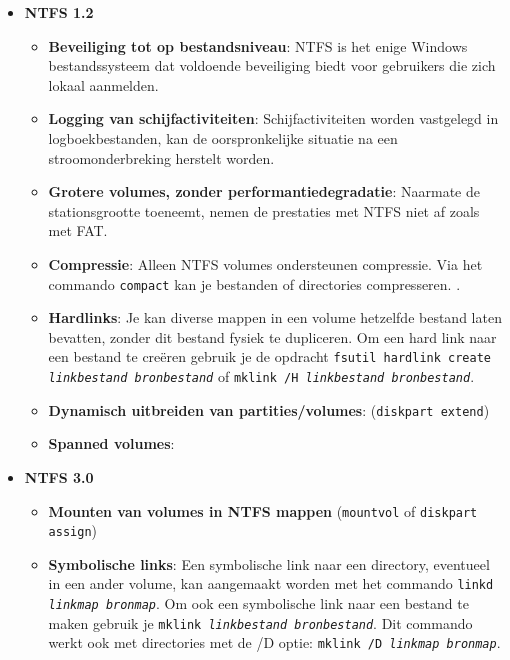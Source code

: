 \begin{enumerate}
		 {
			\begin{itemize}
				\item \textbf{NTFS 1.2}
					\begin{itemize}
						\item \textbf{Beveiliging tot op bestandsniveau}: NTFS is het enige Windows bestandssysteem dat voldoende beveiliging biedt voor gebruikers die zich lokaal aanmelden.
						\item \textbf{Logging van schijfactiviteiten}: Schijfactiviteiten worden vastgelegd in logboekbestanden, kan de oorspronkelijke situatie na een stroomonderbreking herstelt worden.
						\item \textbf{Grotere volumes, zonder performantiedegradatie}: Naarmate de stationsgrootte toeneemt, nemen de prestaties met NTFS niet af zoals met FAT.
						\item \textbf{Compressie}: Alleen NTFS volumes ondersteunen compressie. Via het commando \texttt{compact} kan je bestanden of directories compresseren. .
						\item \textbf{Hardlinks}: Je kan diverse mappen in een volume hetzelfde bestand laten bevatten, zonder dit bestand fysiek te dupliceren. Om een hard link naar een bestand te creëren gebruik je de opdracht \texttt{fsutil hardlink create \emph{linkbestand} \emph{bronbestand}} of \texttt{mklink /H \emph{linkbestand} \emph{bronbestand}}.
						\item \textbf{Dynamisch uitbreiden van partities/volumes}: (\texttt{diskpart extend})
						\item \textbf{Spanned volumes}: 
					\end{itemize}
				\item \textbf{NTFS 3.0}
					\begin{itemize}
						\item \textbf{Mounten van volumes in NTFS mappen} (\texttt{mountvol} of \texttt{diskpart assign})
						\item \textbf{Symbolische links}: Een symbolische link naar een directory, eventueel in een ander volume, kan aangemaakt worden met het commando \texttt{linkd \emph{linkmap} \emph{bronmap}}. Om ook een symbolische link naar een bestand te maken gebruik je \texttt{mklink \emph{linkbestand} \emph{bronbestand}}. Dit commando werkt ook met directories met de /D optie: \texttt{mklink /D \emph{linkmap} \emph{bronmap}}.

\end{itemize}
\end{itemize}}
\end{enumerate}

